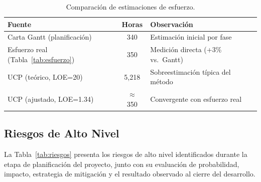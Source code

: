 \begin{table}[H]
\centering
\begin{tabular}{|p{}|c|p{}|}
\hline
\textbf{Fuente} & \textbf{Horas} & \textbf{Observación} \\
\hline
Carta Gantt (planificación) & 340 & Estimación inicial por fase \\
\hline
Esfuerzo real (Tabla~\ref{tab:esfuerzo}) & 350 & Medición directa (+3\% vs.\ Gantt) \\
\hline
UCP (teórico, LOE=20) & 5{,}218 & Sobreestimación típica del método \\
\hline
UCP (ajustado, LOE=1.34) & $\approx$ 350 & Convergente con esfuerzo real \\
\hline
\end{tabular}
\caption{Comparación de estimaciones de esfuerzo.}
\label{tab:comparacion-estimaciones}
\end{table}

\subsection{Riesgos de Alto Nivel}

La Tabla~\ref{tab:riesgos} presenta los riesgos de alto nivel identificados durante la etapa de planificación del proyecto, junto con su evaluación de probabilidad, impacto, estrategia de mitigación y el resultado observado al cierre del desarrollo.

